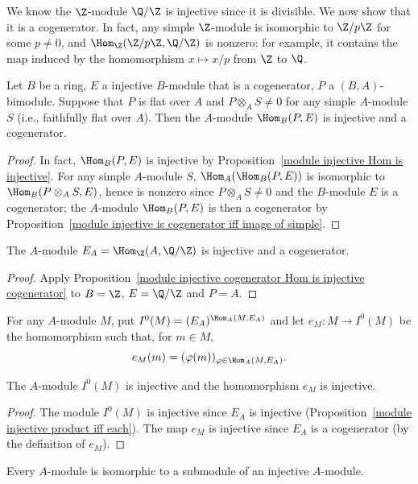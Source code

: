 \begin{example}
We know the $\Z$-module $\Q/\Z$ is injective since it is divisible. We now show that it is a cogenerator. In fact, any simple $\Z$-module is isomorphic to $\Z/p\Z$ for some $p\neq 0$, and $\Hom_\Z(\Z/p\Z,\Q/\Z)$ is nonzero: for example, it contains the map induced by the homomorphism $x\mapsto x/p$ from $\Z$ to $\Q$.
\end{example}
\begin{proposition}\label{module injective cogenerator Hom is injective cogenerator}
Let $B$ be a ring, $E$ a injective $B$-module that is a cogenerator, $P$ a $(B,A)$-bimodule. Suppose that $P$ is flat over $A$ and $P\otimes_AS\neq 0$ for any simple $A$-module $S$ (i.e., faithfully flat over $A$). Then the $A$-module $\Hom_B(P,E)$ is injective and a cogenerator.
\end{proposition}
\begin{proof}
In fact, $\Hom_B(P,E)$ is injective by Proposition~\ref{module injective Hom is injective}. For any simple $A$-module $S$, $\Hom_A(\Hom_B(P,E))$ is isomorphic to $\Hom_B(P\otimes_AS,E)$, hence is nonzero since $P\otimes_AS\neq 0$ and the $B$-module $E$ is a cogenerator; the $A$-module $\Hom_B(P,E)$ is then a cogenerator by Proposition~\ref{module injective is cogenerator iff image of simple}.
\end{proof}
\begin{corollary}\label{module Hom(A,Q/Z) is cogenerator}
The $A$-module $E_A=\Hom_{\Z}(A,\Q/\Z)$ is injective and a cogenerator.
\end{corollary}
\begin{proof}
Apply Proposition~\ref{module injective cogenerator Hom is injective cogenerator} to $B=\Z$, $E=\Q/\Z$ and $P=A$.
\end{proof}
For any $A$-module $M$, put $I^0(M)=(E_A)^{\Hom_A(M,E_A)}$ and let $e_M:M\to I^0(M)$ be the homomorphism such that, for $m\in M$,
\[e_M(m)=(\varphi(m))_{\varphi\in\Hom_A(M,E_A)}.\]
\begin{corollary}\label{module embedded to I^0}
The $A$-module $I^0(M)$ is injective and the homomorphism $e_M$ is injective.
\end{corollary}
\begin{proof}
The module $I^0(M)$ is injective since $E_A$ is injective (Proposition~\ref{module injective product iff each}). The map $e_M$ is injective since $E_A$ is a cogenerator (by the definition of $e_M$).
\end{proof}
\begin{corollary}\label{module embedded to injective}
Every $A$-module is isomorphic to a submodule of an injective $A$-module.
\end{corollary}
